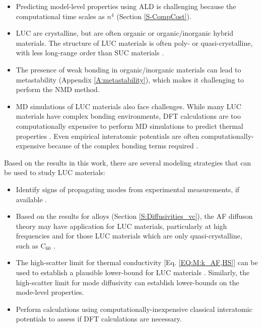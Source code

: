 \begin{itemize}
\item Predicting model-level properties  
using ALD is challenging because the computational time 
scales as $n^4$ (Section \ref{S-CompCost}). 

\item LUC are crystalline, but are often organic or 
organic/inorganic hybrid materials. The structure of LUC 
materials is often poly- or quasi-crystalline, with less 
long-range order than SUC materials 
\cite{andersson_thermal_1996,ong_surface_2013}.

\item The presence of weak bonding in organic/inorganic materials
\cite{frigerio_molecular_2012,
casalegno_solvent-free_2013,ong_surface_2013} 
can lead to metastability 
(Appendix \ref{A:metastability}), which  
makes it challenging to perform the NMD method. 

\item MD simulations of LUC materials also face challenges. 
While many LUC materials have complex bonding environments, 
DFT calculations 
are too computationally expensive to perform MD simulations 
to predict thermal properties 
\cite{kresse_ab_1993,koker_thermal_2009,huang_filler-reduced_2010,
huang_ab_2008,luo_molecular_2011,esfarjani_heat_2011,
shiomi_thermal_2011}. Even empirical interatomic 
potentials are often computationally-expensive because of the 
complex bonding terms required 
\cite{jorgensen_transferable_1981,jorgensen_comparison_1983,
jorgensen_development_1996,jensen_halide_2006}.
\end{itemize}

Based on the results in this work, there are several 
modeling strategies that can be used to study LUC materials:

\begin{itemize}
\item Identify signs of propagating modes from experimental 
measurements, if available
\cite{efimov_phonon-defect_2004,duda_exceptionally_2013}. 
\item Based on the results for alloys 
(Section \ref{S:Diffusivities_vc}), the AF 
diffuson theory may have application for LUC materials, particularly 
at high frequencies and for those LUC materials which are only 
quasi-crystalline, such as C$_{60}$ \cite{andersson_thermal_1996}.
\item The high-scatter limit for thermal conductivity 
[Eq. \eqref{EQ:M:k_AF,HS}] 
can be used to establish a plausible lower-bound for LUC 
materials \cite{cahill_lower_1992}. Similarly, the 
high-scatter limit for mode diffusivity can establish 
lower-bounds on the mode-level properties. 
\item Perform calculations using computationally-inexpensive 
classical interatomic potentials to assess if DFT calculations 
are necessary. 
\end{itemize}

